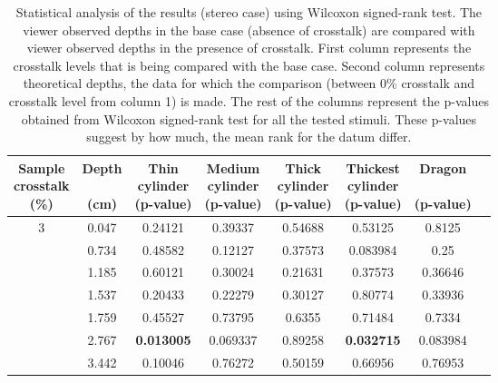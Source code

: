 \begin{table}[H]
  \begin{center}
    \caption{Statistical analysis of the results (stereo case) using Wilcoxon signed-rank test. The viewer observed depths in the base case (absence of crosstalk) are compared with viewer observed depths in the presence of crosstalk. First column  represents the crosstalk levels that is being compared with the base case. Second column represents theoretical depths, the data for which the comparison (between 0\% crosstalk and crosstalk level from column 1) is made. The rest of the columns represent the p-values obtained from Wilcoxon signed-rank test for all the tested stimuli. These p-values suggest by how much, the mean rank for the datum differ. }
    \label{tab:posthoc_stereo}
    \begin{tabular}{cccccccc}
      \toprule
      \specialcell{Sample\\crosstalk\\(\%)} & \specialcell{Depth \\ \\(cm)} & \specialcell{Thin \\cylinder \\(p-value)} & \specialcell{Medium \\cylinder \\(p-value)} & \specialcell{Thick \\cylinder \\(p-value)} & \specialcell{Thickest \\cylinder \\(p-value)} & \specialcell{Dragon \\ \\(p-value)}\\
      \midrule
         3 & 0.047     & 0.24121                     & 0.39337                   & 0.54688                   & 0.53125           & 0.8125 \\
           & 0.734      & 0.48582                     & 0.12127                   & 0.37573                   & 0.083984          & 0.25 \\
           & 1.185       & 0.60121                     & 0.30024                   & 0.21631                   & 0.37573           & 0.36646 \\
           & 1.537       & 0.20433                     & 0.22279                   & 0.30127                   & 0.80774           & 0.33936 \\
           & 1.759        & 0.45527                     & 0.73795                   & 0.6355                    & 0.71484           & 0.7334 \\
           & 2.767       & \textbf{0.013005}                    & 0.069337                  & 0.89258                   & \textbf{0.032715}          & 0.083984 \\
           & 3.442        & 0.10046                     & 0.76272                   & 0.50159                   & 0.66956           & 0.76953 \\
        

\end{tabular}
\end{center}
\end{table}
